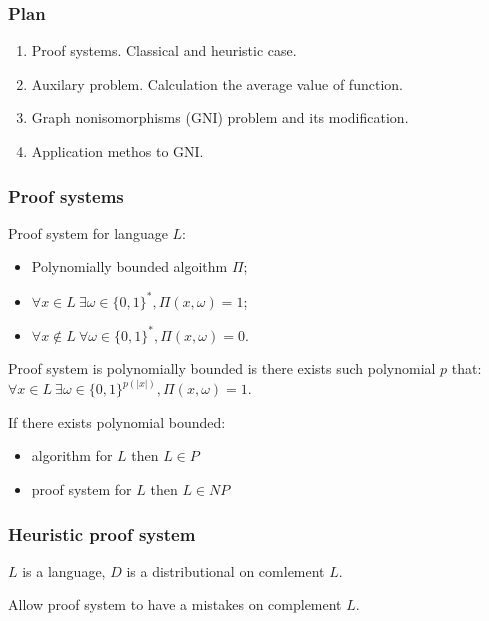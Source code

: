 \begin{frame}
    \frametitle{Plan}

    \begin{enumerate}
	    \item Proof systems. Classical and heuristic case.
    	\item Auxilary problem. Calculation the average value of function.
    	\item Graph nonisomorphisms (GNI) problem and its modification.
    	\item Application methos to GNI.
    \end{enumerate}
\end{frame}

\begin{frame}
	\frametitle{Proof systems}

    \begin{definition}
        Proof system for language $L$:
        \begin{itemize}
            \item Polynomially bounded algoithm $\Pi$;
            \item $\forall x \in L~ \exists \omega \in \{0, 1\}^{*}, \Pi(x, \omega) = 1$;
        	\item $\forall x \notin L~ \forall \omega \in \{0, 1\}^{*}, 
        		\Pi(x, \omega) = 0$.
        \end{itemize}
    \end{definition}

    Proof system is polynomially bounded is there exists such polynomial $p$ that:
    $\forall x \in L~ \exists \omega \in \{0, 1\}^{p(|x|)}, \Pi(x, \omega) = 1$.


    If there exists polynomial bounded:
    \begin{itemize}
        \item algorithm for $L$ then $L \in P$
	    \item proof system for $L$ then $L \in NP$
    \end{itemize}

\end{frame}

\begin{frame}
    \frametitle{Heuristic proof system}

    $L$ is a language, $D$ is a distributional on comlement $L$.

    Allow proof system to have a mistakes on complement $L$.

    
    


\end{frame}


